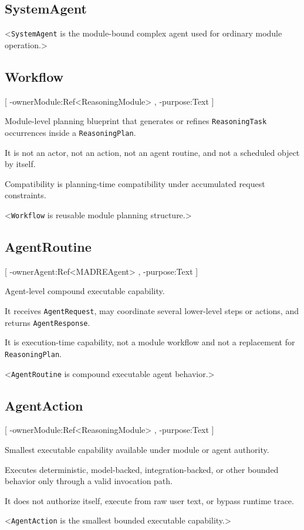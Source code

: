 \subsection{SystemAgent}
<\texttt{SystemAgent} is the module-bound complex agent used for ordinary module operation.>

\subsection{Workflow}
[
	\UMLAt-ownerModule:Ref<ReasoningModule> ,
	\UMLAt-purpose:Text
]{%
	\item[] Module-level planning blueprint that generates or refines \texttt{ReasoningTask} occurrences inside a \texttt{ReasoningPlan}.
	\item[] It is not an actor, not an action, not an agent routine, and not a scheduled object by itself.
	\item[] Compatibility is planning-time compatibility under accumulated request constraints.
}<\texttt{Workflow} is reusable module planning structure.>

\subsection{AgentRoutine}
[
	\UMLAt-ownerAgent:Ref<MADREAgent> ,
	\UMLAt-purpose:Text
]{%
	\item[] Agent-level compound executable capability.
	\item[] It receives \texttt{AgentRequest}, may coordinate several lower-level steps or actions, and returns \texttt{AgentResponse}.
	\item[] It is execution-time capability, not a module workflow and not a replacement for \texttt{ReasoningPlan}.
}<\texttt{AgentRoutine} is compound executable agent behavior.>

\subsection{AgentAction}
[
	\UMLAt-ownerModule:Ref<ReasoningModule> ,
	\UMLAt-purpose:Text
]{%
	\item[] Smallest executable capability available under module or agent authority.
	\item[] Executes deterministic, model-backed, integration-backed, or other bounded behavior only through a valid invocation path.
	\item[] It does not authorize itself, execute from raw user text, or bypass runtime trace.
}<\texttt{AgentAction} is the smallest bounded executable capability.>

